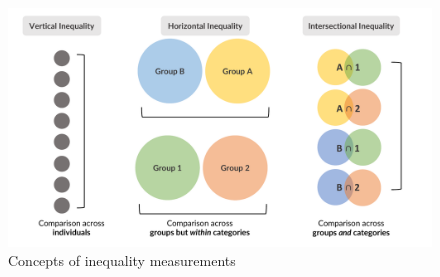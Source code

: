 \begin{figure}[htb]
\includegraphics{latex/figures/intersectionality_framework.pdf} \caption[Concepts of inequality measurement]{Concepts of inequality measurements}\label{fig:intersectionality-framework}
\end{figure}

